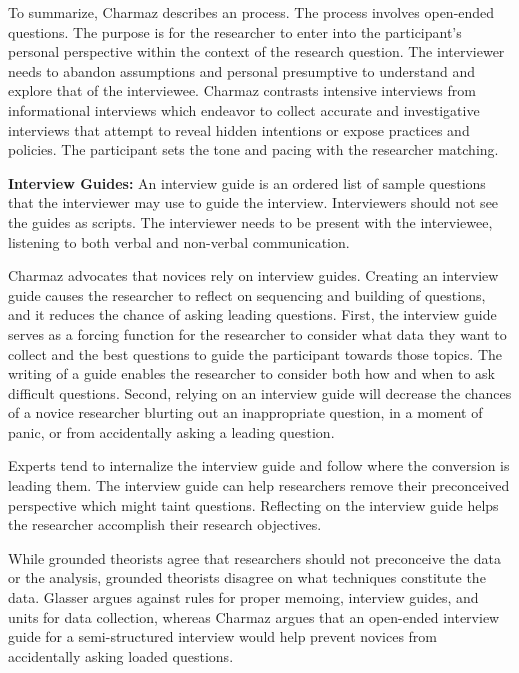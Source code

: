 To summarize, Charmaz describes an  process. The process involves open-ended questions. The purpose is for the researcher to enter into the participant's personal perspective within the context of the research question. The interviewer needs to abandon assumptions and personal presumptive to understand and explore that of the interviewee. Charmaz contrasts intensive interviews from informational interviews which endeavor to collect accurate  and investigative interviews that attempt to reveal hidden intentions or expose practices and policies. The participant sets the tone and pacing with the researcher matching. 

\textbf{Interview Guides:} An interview guide is an ordered list of sample questions that the interviewer may use to guide the interview. Interviewers should not see the guides as scripts. The interviewer needs to be present with the interviewee, listening to both verbal and non-verbal communication.

Charmaz advocates that novices rely on interview guides. Creating an interview guide causes the researcher to reflect on sequencing and building of questions, and it reduces the chance of asking leading questions. First, the interview guide serves as a forcing function for the researcher to consider what data they want to collect and the best questions to guide the participant towards those topics. The writing of a guide enables the researcher to consider both how and when to ask difficult questions. Second, relying on an interview guide will decrease the chances of a novice researcher blurting out an inappropriate question, in a moment of panic, or from accidentally asking a leading question. 

Experts tend to internalize the interview guide and follow where the conversion is leading them. The interview guide can help researchers remove their preconceived perspective which might taint questions. Reflecting on the interview guide helps the researcher accomplish their research objectives. 

While grounded theorists agree that researchers should not preconceive the data or the analysis, grounded theorists disagree on what techniques constitute  the data. Glasser \cite{GlaserIssues} argues against rules for proper memoing, interview guides, and units for data collection, whereas Charmaz argues that an open-ended interview guide for a semi-structured interview would help prevent novices from accidentally asking loaded questions. 

